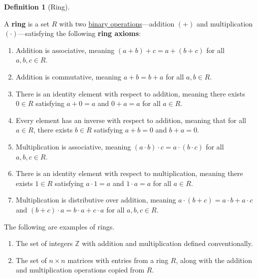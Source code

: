 \documentclass{scrartcl}
\theoremstyle{definition}
\newtheorem{definition}{Definition}[section]
\theoremstyle{plain}
\theoremstyle{remark}
\begin{document}
\begin{definition}[Ring]
    \label{def:ring}

    \newcommand{\Z}{\mathbb{Z}}

    A \textbf{ring} is a set $R$ with two \hyperref[def:binary operation]{binary operations}---addition $(+)$ and
    multiplication $(\cdot)$---satisfying the following \textbf{ring axioms}:
    \begin{enumerate}
        \item Addition is associative, meaning $(a+b)+c=a+(b+c)$ for all $a,b,c\in R$.
        \item Addition is commutative, meaning $a+b=b+a$ for all $a,b\in R$.

        \item
            There is an identity element with respect to addition, meaning there exists $0\in R$ satisfying $a+0=a$ and
            $0+a=a$ for all $a\in R$.

        \item
            Every element has an inverse with respect to addition, meaning that for all $a\in R$, there exists $b\in R$
            satisfying $a+b=0$ and $b+a=0$.

        \item Multiplication is associative, meaning $(a\cdot b)\cdot c=a\cdot (b\cdot c)$ for all $a,b,c\in R$.

        \item
            There is an identity element with respect to multiplication, meaning there exists $1\in R$ satisfying
            $a\cdot 1=a$ and $1\cdot a=a$ for all $a\in R$.

        \item
            Multiplication is distributive over addition, meaning $a\cdot (b+c)=a\cdot b+a\cdot c$ and
            $(b+c)\cdot a=b\cdot a+c\cdot a$ for all $a,b,c\in R$.
    \end{enumerate}

    The following are examples of rings.
    \begin{enumerate}
        \item The set of integers $\Z$ with addition and multiplication defined conventionally.
        \item
            The set of $n\times n$ matrices with entries from a ring $R$, along with the addition and multiplication
            operations copied from $R$.
    \end{enumerate}
\end{definition}
\end{document}
